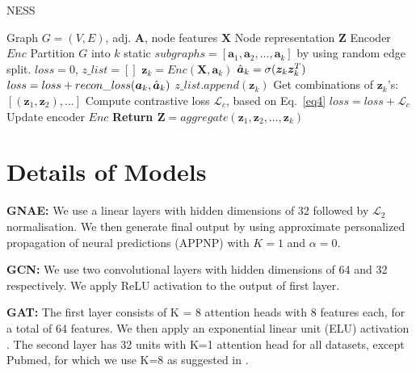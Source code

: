 \documentclass{article}
\begin{document}
\begin{algorithm}[h]
   \caption{NESS}
   \label{alg:ness}
\begin{algorithmic}
    Graph $G=(V, E)$, adj. $\bm A$, node features $\bm X$
    Node representation $\bm Z$
    Encoder $Enc$
   \STATE Partition $G$ into $k$ static $subgraphs=[\bm a_1,\bm a_2, ...,\bm a_k]$ by using random edge split.
    \STATE $loss=0$, $z\_list=[]$
            \STATE $\bm z_{k} = Enc(\bm X, \bm a_k)$  
            \STATE $\Hat{\bm a}_{k} = \sigma(\bm z_{k}\bm z_{k}^T)$  
            \STATE $loss = loss + recon\_loss(\bm a_{k},\Hat{\bm a}_{k})$  
            \STATE $z\_list.append(\bm z_{k})$  
        \ENDFOR
            \STATE Get combinations of $\bm z_{k}$'s: $[(\bm z_{1}, \bm z_{2}), ...]$
            \STATE Compute contrastive loss $\mathcal{L}_c$, based on Eq.~\ref{eq4}
            \STATE $loss = loss + \mathcal{L}_c$
        \ENDIF
    \STATE Update encoder $Enc$
   \ENDFOR
    \STATE \bfseries  Return $\bm Z=aggregate(\bm z_{1},\bm  z_{2}, ...,\bm  z_{k})$

\end{algorithmic}
\end{algorithm}



\section{Details of Models}\label{details_of_models}

\textbf{GNAE:} We use a linear layers with hidden dimensions of 32 followed by $\mathcal{L}_2$ normalisation. We then generate final output by using approximate personalized propagation of neural predictions (APPNP) \citep{gasteiger2018predict} with $K=1$ and $\alpha=0$.


\textbf{GCN:} We use two convolutional layers with hidden dimensions of 64 and 32 respectively. We apply ReLU activation \citep{nair2010rectified} to the output of first layer.

\textbf{GAT:} The first layer consists of K = 8 attention heads with 8 features each, for a total of 64 features. We then apply an exponential linear unit (ELU) activation \citep{clevert2015fast}. The second layer has 32 units with K=1 attention head for all datasets, except Pubmed, for which we use K=8 as suggested in \citep{velivckovic2017graph}.
\end{document}
